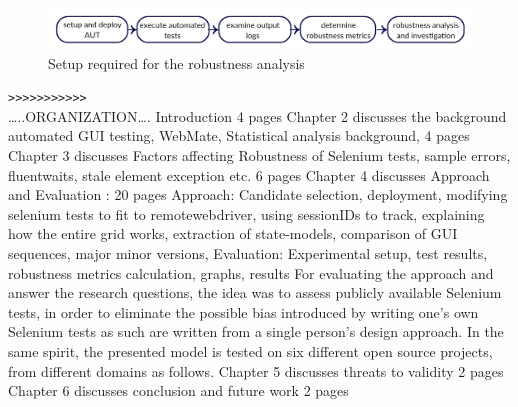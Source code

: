 \begin{figure}
	\centering	\includegraphics[width=\textwidth]{./Figures/thesisoverviewsmall.jpg}
	\caption{Setup required for the robustness analysis}
	\label{fig:thesisoverview}
\end{figure} 

\texttt{>>>>>>>>>>>}\\

…..ORGANIZATION….
Introduction 4 pages
Chapter 2 discusses the background automated GUI testing, WebMate, Statistical analysis background, 4 pages
Chapter 3 discusses Factors affecting Robustness of Selenium tests, sample errors, fluentwaits, stale element exception etc. 6 pages
Chapter 4 discusses Approach and Evaluation : 20 pages
Approach: Candidate selection, deployment, modifying selenium tests to fit to remotewebdriver, using sessionIDs to track, explaining how the entire grid works, extraction of state-models, comparison of GUI sequences, major minor versions,
Evaluation: Experimental setup, test results, robustness metrics calculation, graphs, results
For evaluating the approach and answer the research questions, the idea was to assess publicly available Selenium tests, in order to eliminate the possible bias introduced by writing one’s own Selenium tests as such are written from a single person’s design approach. In the same spirit, the presented model is tested on six different open source projects, from different domains as follows.
Chapter 5 discusses threats to validity 2 pages
Chapter 6 discusses conclusion and future work 2 pages
 

